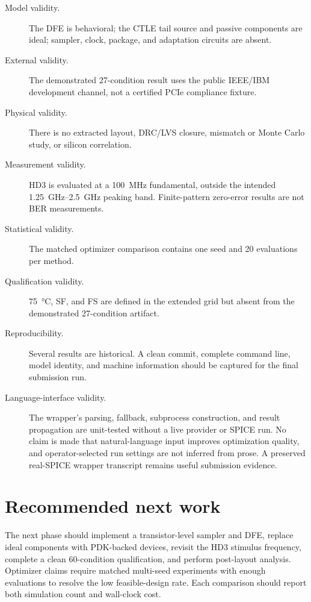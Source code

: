 \begin{description}
  \item[Model validity.] The DFE is behavioral; the CTLE tail source and passive
  components are ideal; sampler, clock, package, and adaptation circuits are
  absent.
  \item[External validity.] The demonstrated 27-condition result uses the public
  IEEE/IBM development channel, not a certified PCIe compliance fixture.
  \item[Physical validity.] There is no extracted layout, DRC/LVS closure,
  mismatch or Monte Carlo study, or silicon correlation.
  \item[Measurement validity.] HD3 is evaluated at a \SI{100}{MHz} fundamental,
  outside the intended \SIrange{1.25}{2.5}{GHz} peaking band. Finite-pattern
  zero-error results are not BER measurements.
  \item[Statistical validity.] The matched optimizer comparison contains one
  seed and 20 evaluations per method.
  \item[Qualification validity.] \SI{75}{\degreeCelsius}, SF, and FS are defined
  in the extended grid but absent from the demonstrated 27-condition artifact.
  \item[Reproducibility.] Several results are historical. A clean commit,
  complete command line, model identity, and machine information should be
  captured for the final submission run.
  \item[Language-interface validity.] The wrapper's parsing, fallback,
  subprocess construction, and result propagation are unit-tested without a
  live provider or SPICE run. No claim is made that natural-language input
  improves optimization quality, and operator-selected run settings are not
  inferred from prose. A preserved real-SPICE wrapper transcript remains useful
  submission evidence.
\end{description}

\section{Recommended next work}

The next phase should implement a transistor-level sampler and DFE, replace
ideal components with PDK-backed devices, revisit the HD3 stimulus frequency,
complete a clean 60-condition qualification, and perform post-layout analysis.
Optimizer claims require matched multi-seed experiments with enough evaluations
to resolve the low feasible-design rate. Each comparison should report both
simulation count and wall-clock cost.
